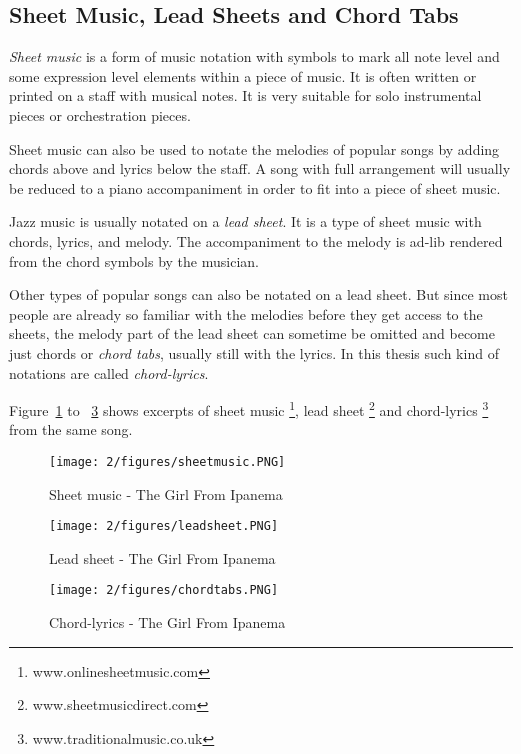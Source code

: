 \subsection{Sheet Music, Lead Sheets and Chord Tabs}
{\it Sheet music} is a form of music notation with symbols to mark all note level and some expression level elements within a piece of music. It is often written or printed on a staff with musical notes. It is very suitable for solo instrumental pieces or orchestration pieces.

Sheet music can also be used to notate the melodies of popular songs by adding chords above and lyrics below the staff. A song with full arrangement will usually be reduced to a piano accompaniment in order to fit into a piece of sheet music.

Jazz music is usually notated on a {\it lead sheet}. It is a type of sheet music with chords, lyrics, and melody. The accompaniment to the melody is ad-lib rendered from the chord symbols by the musician.

Other types of popular songs can also be notated on a lead sheet. But since most people are already so familiar with the melodies before they get access to the sheets, the melody part of the lead sheet can sometime be omitted and become just chords or {\it chord tabs}, usually still with the lyrics. In this thesis such kind of notations are called {\it chord-lyrics}.

Figure~\ref{fig:2-sheetmusic} to ~\ref{fig:2-chordtabs} shows excerpts of sheet music \footnote{www.onlinesheetmusic.com}, lead sheet \footnote{www.sheetmusicdirect.com} and chord-lyrics \footnote{www.traditionalmusic.co.uk} from the same song.

\begin{figure}[htb]
\centering
\texttt{[image: 2/figures/sheetmusic.PNG]}
\caption{Sheet music - The Girl From Ipanema}
\label{fig:2-sheetmusic}
\end{figure}

\begin{figure}[htb]
\centering
\texttt{[image: 2/figures/leadsheet.PNG]}
\caption{Lead sheet - The Girl From Ipanema}
\label{fig:2-leadsheet}
\end{figure}

\begin{figure}[htb]
\centering
\texttt{[image: 2/figures/chordtabs.PNG]}
\caption{Chord-lyrics - The Girl From Ipanema}
\label{fig:2-chordtabs}
\end{figure}

